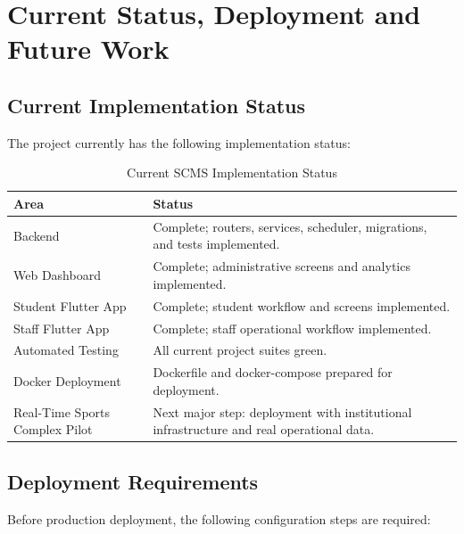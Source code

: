 \documentclass[12pt,a4paper,oneside]{report}
\begin{document}
\chapter{Current Status, Deployment and Future Work}

\section{Current Implementation Status}

The project currently has the following implementation status:

\begin{table}[H]
\centering
\small
\begin{tabular}{p{5cm}p{6.8cm}}
\toprule
\textbf{Area} & \textbf{Status}\\
\midrule
Backend & Complete; routers, services, scheduler, migrations, and tests implemented.\\
Web Dashboard & Complete; administrative screens and analytics implemented.\\
Student Flutter App & Complete; student workflow and screens implemented.\\
Staff Flutter App & Complete; staff operational workflow implemented.\\
Automated Testing & All current project suites green.\\
Docker Deployment & Dockerfile and docker-compose prepared for deployment.\\
Real-Time Sports Complex Pilot & Next major step: deployment with institutional infrastructure and real operational data.\\
\bottomrule
\end{tabular}
\caption{Current SCMS Implementation Status}
\label{tab:status}
\end{table}

\section{Deployment Requirements}

Before production deployment, the following configuration steps are required:
\end{document}
